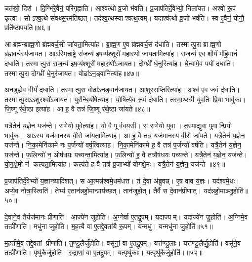 चत॑स्रो॒ दिश॑। दि॒ग्भिरे॒वैनं॒ परि॑गृह्णाति। आश्व॑त्थो व्र॒जो भ॑वति। प्र॒जाप॑तिर्दे॒वेभ्यो॒ निला॑यत। अश्वो॑ रू॒पं कृ॒त्वा। सोऽश्व॒त्थे सं॑वथ्स॒रम॑तिष्ठत्। तद॑श्व॒त्थस्याश्वत्थ॒त्वम्। यदाश्व॑त्थो व्र॒जो भव॑ति। स्व ए॒वैनं॒ योनौ॒ प्रति॑ष्ठापयति॥४६॥\anuvakamend[त्रि॒ष्टुभ॒श्छन्द॒सोऽधि॒ निर्मि॑मीते जुहोति॒ नव॑ च]

आ ब्रह्म॑न्ब्राह्म॒णो ब्र॑ह्मवर्च॒सी जा॑यता॒मित्या॑ह। ब्रा॒ह्म॒ण ए॒व ब्र॑ह्मवर्च॒सं द॑धाति। तस्मात्पु॒रा ब्राह्म॒णो ब्र॑ह्मवर्च॒स्य॑जायत। आऽस्मिन्रा॒ष्ट्रे रा॑ज॒न्य॑ इष॒व्य॑श्शूरो॑ महार॒थो जा॑यता॒मित्या॑ह। रा॒ज॒न्य॑ ए॒व शौ॒र्यं म॑हि॒मानं॑ दधाति। तस्मात्पु॒रा रा॑ज॒न्य॑ इष॒व्य॑श्शूरो॑ महार॒थो॑ऽजायत। दोग्ध्री॑ धे॒नुरित्या॑ह। धे॒न्वामे॒व पयो॑ दधाति। तस्मात्पु॒रा दोग्ध्री॑ धे॒नुर॑जायत। वोढा॑ऽन॒ड्वानित्या॑ह॥४७॥

अ॒न॒डुह्ये॒व वी॒र्यं॑ दधाति। तस्मात्पु॒रा वोढा॑ऽन॒ड्वान॑जायत। आ॒शुस्सप्ति॒रित्या॑ह। अश्व॑ ए॒व ज॒वं द॑धाति। तस्मात्पु॒राऽऽशुरश्वो॑ऽजायत। पुर॑न्धि॒र्योषेत्या॑ह। यो॒षित्ये॒व रू॒पं द॑धाति। तस्मा॒थ्स्त्री यु॑व॒तिः प्रि॒या भावु॑का। जि॒ष्णू र॑थे॒ष्ठा इत्या॑ह। आ ह॒ वै तत्र॑ जि॒ष्णू र॑थे॒ष्ठा जा॑यते॥४८॥

यत्रै॒तेन॑ य॒ज्ञेन॒ यज॑न्ते। स॒भेयो॒ युवेत्या॑ह। यो वै पूर्ववय॒सी। स स॒भेयो॒ युवा। तस्मा॒द्युवा॒ पुमान्प्रि॒यो भावु॑कः। आऽस्य यज॑मानस्य वी॒रो जा॑यता॒मित्या॑ह। आ ह॒ वै तत्र॒ यज॑मानस्य वी॒रो जा॑यते। यत्रै॒तेन॑ य॒ज्ञेन॒ यज॑न्ते। नि॒का॒मेनि॑कामे नः प॒र्जन्यो॑ वर्\mbox{}ष॒त्वित्या॑ह। नि॒का॒मेनि॑कामे ह॒ वै तत्र॑ प॒र्जन्यो॑ वर्\mbox{}षति। यत्रै॒तेन॑ य॒ज्ञेन॒ यज॑न्ते। फ॒लिन्यो॑ न॒ ओष॑धयः पच्यन्ता॒मित्या॑ह। फ॒लिन्यो॑ ह॒ वै तत्रौष॑धयः पच्यन्ते। यत्रै॒तेन॑ य॒ज्ञेन॒ यज॑न्ते। यो॒ग॒क्षे॒मो न॑ कल्पता॒मित्या॑ह। कल्प॑ते ह॒ वै तत्र॑ प्र॒जाभ्यो॑ योगक्षे॒मः। यत्रै॒तेन॑ य॒ज्ञेन॒ यज॑न्ते ॥४९॥\anuvakamend[अ॒न॒ड्वानित्या॑ह जायते वर्‌षति स॒प्त च॑]

प्र॒जाप॑तिर्दे॒वेभ्यो॑ य॒ज्ञान्व्यादि॑शत्। स आ॒त्मन्न॑श्वमे॒धम॑धत्त। तं दे॒वा अ॑ब्रुवन्न्। ए॒ष वाव य॒ज्ञः। यद॑श्वमे॒धः। अप्ये॒व नोत्रा॒स्त्विति॑। तेभ्य॑ ए॒तान॑न्नहो॒मान्प्राय॑च्छत्। तान॑जुहोत्। तैर्वै स दे॒वान॑प्रीणात्। यद॑न्नहो॒माञ्जु॒होति॑॥५०॥

दे॒वाने॒व तैर्यज॑मानः प्रीणाति। आज्ये॑न जुहोति। अ॒ग्नेर्वा ए॒तद्रू॒पम्। यदाज्यम्। यदाज्ये॑न जु॒होति॑। अ॒ग्निमे॒व तत्प्री॑णाति। मधु॑ना जुहोति। म॒ह॒त्यै वा ए॒तद्दे॒वता॑यै रू॒पम्। यन्मधु॑। यन्मधु॑ना जु॒होति॑॥५१॥

म॒ह॒तीमे॒व तद्दे॒वतां प्रीणाति। त॒ण्डु॒लैर्जु॑होति। वसू॑नां॒ वा ए॒तद्रू॒पम्। यत्त॑ण्डु॒लाः। यत्त॑ण्डु॒लैर्जु॒होति॑। वसू॑ने॒व तत्प्री॑णाति। पृथु॑कैर्जुहोति। रु॒द्राणां॒ वा ए॒तद्रू॒पम्। यत्पृथु॑काः। यत्पृथु॑कैर्जु॒होति॑।॥५२॥


